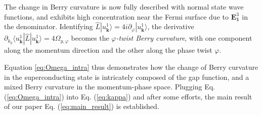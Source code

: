 The change in Berry curvature is now fully described with normal state wave functions, and exhibits high concentration near the Fermi surface due to  $\mathbf{E}_{\mathbf 1}^3$ in the denominator. Identifying $\hat L|u_{\bm k}^1\rangle=4i\partial_\varphi|u_{\bm k}^1\rangle$, the derivative $\partial_{k_y}\langle u_{\bm k}^1|\hat L|u_{\bm k}^1\rangle=4\Omega_{y,\varphi}$ becomes the \emph{$\varphi$-twist Berry curvature}, with one component along the momentum direction and the other along the phase twist $\varphi$.

Equation \eqref{eq:Omega_intra} thus demonstrates how the change of Berry curvature in the superconducting state is intricately composed of the gap function, and a mixed Berry curvature in the momentum-phase space. Plugging Eq. (\ref{eq:Omega_intra}) into Eq. (\ref{eq:kappa}) and after some efforts, the main result of our paper Eq. (\ref{eq:main_result}) is established. 


